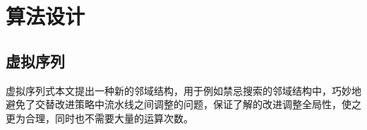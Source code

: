 \theoremheaderfont{\heiti}
\newtheorem{algori}[algor]{算法}
\newcommand{\Step}[1]{\textbf{Step#1}}
\newcommand{\refa}[1]{\textbf{算法} \ref{#1}}
\chapter{算法设计}

\section{虚拟序列}
虚拟序列式本文提出一种新的邻域结构，用于例如禁忌搜索的邻域结构中，巧妙地避免了交替改进策略中流水线之间调整的问题，保证了解的改进调整全局性，使之更为合理，同时也不需要大量的运算次数。

